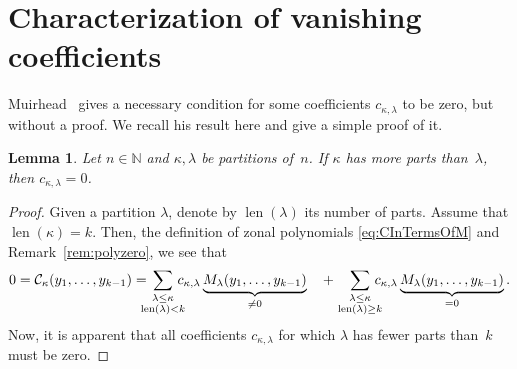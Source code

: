 \documentclass{mathincs}
\numberwithin{equation}{section}
\numberwithin{figure}{section}
\theoremstyle{plain}
\theoremstyle{definition}
\theoremstyle{remark}
\theoremstyle{plain}
\theoremstyle{definition}
\theoremstyle{plain}
\newtheorem{lemma}[thm]{Lemma}
\theoremstyle{plain}
\begin{document}
\section{Characterization of vanishing coefficients}\label{sec:zeros}

Muirhead~\cite[Lem.~7.2.3]{Muirhead} gives a necessary condition for some
coefficients $c_{\kappa,\lambda}$ to be zero, but without a proof. We recall his
result here and give a simple proof of it.
\begin{lemma}\label{lem:zero1}
  Let $n\in\mathbb{N}$ and $\kappa,\lambda$ be partitions of~$n$. If $\kappa$
  has more parts than~$\lambda$, then $c_{\kappa,\lambda}=0$.
\end{lemma}
\begin{proof}
  Given a partition $\lambda$, denote by $\operatorname{len}(\lambda)$ its
  number of parts. Assume that $\operatorname{len}(\kappa)=k$. Then, the
  definition of zonal polynomials \eqref{eq:CInTermsOfM} and
  Remark~\ref{rem:polyzero}, we see that
 \[ 
 0 = \mathcal{C}_{\kappa}(y_1,\dots,y_{k-1})= 
  \!\!\!\!\!\sum_{\textstyle\genfrac{}{}{0pt}{}{\lambda\leq\kappa}{\operatorname{len}(\lambda)<k}}\!\!\!\!\!
      c_{\kappa,\lambda} \underbrace{M_{\lambda}(y_1,\dots,y_{k-1})}_{\neq0} \quad +
   \sum_{\textstyle\genfrac{}{}{0pt}{}{\lambda\leq\kappa}{\operatorname{len}(\lambda)\geq k}}\!\!\!\!\!
    c_{\kappa,\lambda} \underbrace{M_{\lambda}(y_1,\dots,y_{k-1})}_{=0}.
 \] 
  Now, it is apparent that all coefficients $c_{\kappa,\lambda}$
  for which $\lambda$ has fewer parts than~$k$ must be zero.
\end{proof}
\end{document}
